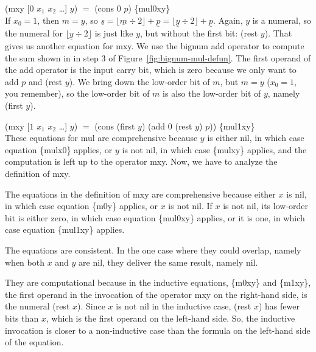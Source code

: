 \vspace{2mm}\hspace*{2cm} \textsf{(mxy [$0$ $x_1$ $x_2$ \dots] $y$)} $=$ \textsf{(cons $0$ $p$)} \hfill \{mul0xy\}\\

If $x_0 = 1$, then $m = y$,
so $\underline{s} = \lfloor \underline{m}\div 2\rfloor + \underline{p} = \lfloor \underline{y}\div 2\rfloor + \underline{p}$.
Again, $y$ is a numeral, so the numeral for $\lfloor \underline{y}\div 2\rfloor$
is just like $y$, but without the first bit: (rest $y$).
That gives us another equation for \textsf{mxy}.
We use the bignum \textsf{add} operator to compute the sum
shown in in step 3 of Figure~\ref{fig:bignum-mul-defun}.
The first operand of the \textsf{add} operator is the input carry bit,
which is zero because we only want to add $p$ and \textsf{(rest $y$)}.
We bring down the low-order bit of $m$, but $m = y$
($x_0 = 1$, you remember), so the low-order bit of $m$
is also the low-order bit of $y$, namely \textsf{(first $y$)}.

\vspace{2mm}\hspace*{2cm} \textsf{(mxy [$1$ $x_1$ $x_2$ \dots] $y$)} $=$ \textsf{(cons (first $y$) (add 0 (rest $y$) $p$))} \hfill \{mul1xy\}\\

These equations for \textsf{mul} are comprehensive because $y$ is either \textsf{nil},
in which case equation \{mulx0\} applies,
or $y$ is not \textsf{nil}, in which case \{mulxy\} applies, and
the computation is left up to the operator \textsf{mxy}.
Now, we have to analyze the definition of \textsf{mxy}.

The equations in the definition of \textsf{mxy} are comprehensive
because either $x$ is \textsf{nil}, in which case
equation \{m0y\} applies, or $x$ is not \textsf{nil}.
If $x$ is not \textsf{nil}, its low-order bit is either zero,
in which case equation \{mul0xy\} applies, or it is one,
in which case equation \{mul1xy\} applies.

The equations are consistent. In the one case
where they could overlap, namely when both $x$ and $y$
are \textsf{nil}, they deliver the same result, namely \textsf{nil}.

They are computational because in the inductive equations,
\{m0xy\} and \{m1xy\}, the first operand in
the invocation of the operator \textsf{mxy} on the right-hand side,
is the numeral \textsf{(rest $x$)}.
Since $x$ is not \textsf{nil} in the inductive case,
\textsf{(rest $x$)} has fewer bits than $x$, which is the first operand
on the left-hand side.
So, the inductive invocation is closer to a non-inductive
case than the formula on the left-hand side of the equation.

